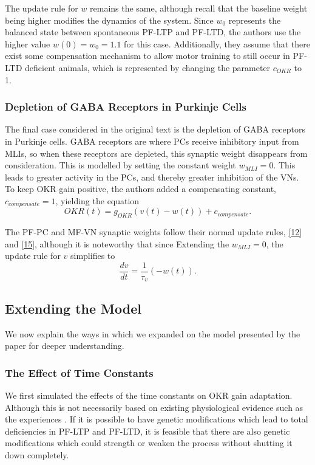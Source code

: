 \documentclass[10pt]{article}
\begin{document}
The update rule for \(w\) remains the same, although recall that the baseline weight being higher modifies the dynamics of the system. Since \(w_0\) represents the balanced state between spontaneous PF-LTP and PF-LTD, the authors use the higher value \(w(0)=w_0=1.1\) for this case. Additionally, they assume that there exist some compensation mechanism to allow motor training to still occur in PF-LTD deficient animals, which is represented by changing the parameter \(c_{OKR}\) to 1.

\subsubsection{Depletion of GABA Receptors in Purkinje Cells}

The final case considered in the original text is the depletion of GABA receptors in Purkinje cells. GABA receptors are where PCs receive inhibitory input from MLIs, so when these receptors are depleted, this synaptic weight disappears from consideration. This is modelled by setting the constant weight \(w_{MLI}=0\). This leads to greater activity in the PCs, and thereby greater inhibition of the VNs. To keep OKR gain positive, the authors added a compensating constant, \(c_{compensate}=1\), yielding the equation
\begin{equation}
    \label{21}
    OKR(t) = g_{OKR}(v(t)-w(t))+c_{compensate}.
\end{equation}

The PF-PC and MF-VN synaptic weights follow their normal update rules, \eqref{12} and \eqref{15}, although it is noteworthy that since Extending the \(w_{MLI}=0\), the update rule for \(v\) simplifies to \begin{equation}
    \label{22}
    \frac{dv}{dt} = \frac{1}{\tau_v}(-w(t)).
\end{equation}

\subsection{Extending the Model}

We now explain the ways in which we expanded on the model presented by the paper for deeper understanding.

\subsubsection{The Effect of Time Constants}

We first simulated the effects of the time constants on OKR gain adaptation. Although this is not necessarily based on existing physiological evidence such as the experiences . If it is possible to have genetic modifications which lead to total deficiencies in PF-LTP and PF-LTD, it is feasible that there are also genetic modifications which could strength or weaken the process without shutting it down completely.
\end{document}
